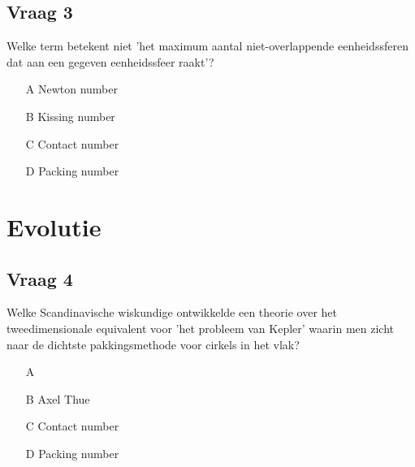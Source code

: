 \documentclass[dutch]{beamer}
\begin{document}
\subsection{Vraag 3 }
\begin{frame}

\begin{block}
{Welke term betekent niet 'het maximum aantal niet-overlappende eenheidssferen dat aan een gegeven eenheidssfeer raakt'?}

\begin{itemize}
	\item[A] Newton number
	\item[B] Kissing number
	\item[C] Contact number
	\item[D] Packing number
	\end{itemize}
\end{block}

\end{frame}

\section{Evolutie}
\subsection{Vraag 4}
\begin{frame}

\begin{block}
{Welke Scandinavische wiskundige ontwikkelde een theorie over het tweedimensionale equivalent voor 'het probleem van Kepler' waarin men zicht naar de dichtste pakkingsmethode voor cirkels in het vlak?}

\begin{itemize}
	\item[A] 
	\item[B] Axel Thue
	\item[C] Contact number
	\item[D] Packing number
	\end{itemize}
\end{block}

\end{frame}
\end{document}
